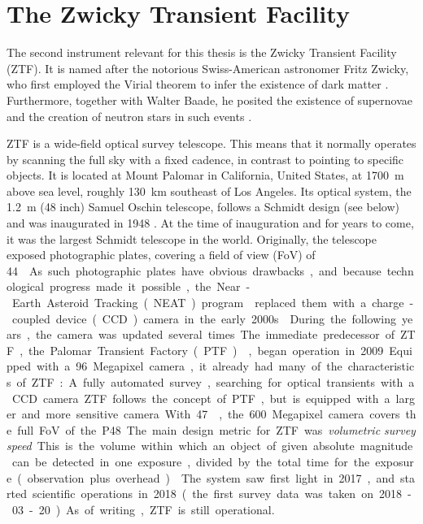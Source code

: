 \chapter{The Zwicky Transient Facility} \label{ztf}
The second instrument relevant for this thesis is the Zwicky Transient Facility (ZTF). It is named after the notorious Swiss-American astronomer Fritz Zwicky, who first employed the Virial theorem to infer the existence of dark matter . Furthermore, together with Walter Baade, he posited the existence of supernovae and the creation of neutron stars in such events .

ZTF is a wide-field optical survey telescope. This means that it normally operates by scanning the full sky with a fixed cadence, in contrast to pointing to specific objects. It is located at Mount Palomar in California, United States, at \SI{1700}{\m} above sea level, roughly \SI{130}{\km} southeast of Los Angeles. Its optical system, the \SI{1.2}{\m} (48 inch) Samuel Oschin telescope, follows a Schmidt design (see below) and was inaugurated in 1948 \cite{Harrington1952}. At the time of inauguration and for years to come, it was the largest Schmidt telescope in the world. Originally, the telescope exposed  photographic plates, covering a field of view (FoV) of \SI{44}{\square\deg}. As such photographic plates have obvious drawbacks, and because technological progress made it possible, the Near-Earth Asteroid Tracking (NEAT) program  replaced them with a charge-coupled device (CCD) camera in the early 2000s.

During the following years, the camera was updated several times. The immediate predecessor of ZTF, the Palomar Transient Factory (PTF) , began operation in 2009. Equipped with a 96 Megapixel camera, it already had many of the characteristics of ZTF: A fully automated survey, searching for optical transients with a CCD camera.

ZTF follows the concept of PTF, but is equipped with a larger and more sensitive camera. With \SI{47}{\square\deg}, the 600 Megapixel camera covers the full FoV of the P48. The main design metric for ZTF was \textit{volumetric survey speed}. This is the volume within which an object of given absolute magnitude can be detected in one exposure, divided by the total time for the exposure (observation plus overhead) . The system saw first light in 2017, and started scientific operations in 2018 (the first survey data was taken on 2018-03-20). As of writing, ZTF is still operational.

